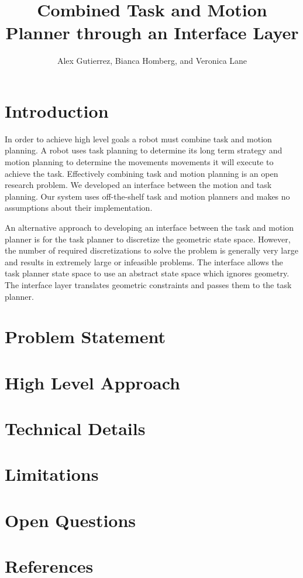 \documentclass[12pt]{article}
\title{Combined Task and Motion Planner through an Interface Layer}
\author{Alex Gutierrez, Bianca Homberg, and Veronica Lane}
\begin{document}
\maketitle

\section{Introduction}

In order to achieve high level goals a robot must combine task and motion planning. A robot uses task planning to determine its long term strategy and motion planning to determine the movements movements it  will execute to achieve the task. Effectively combining task and motion planning is an open research problem. We developed an interface between the motion and task planning. Our system uses off-the-shelf task and motion planners and makes no assumptions about their implementation.
 
An alternative approach to developing an interface between the task and motion planner is for the task planner to discretize the geometric state space. However, the number of required discretizations to solve the problem is generally very large and results in extremely large or infeasible problems. The interface allows the task planner state space to use an abstract state space which ignores geometry. The interface layer translates geometric constraints and passes them to the task planner.
\section{Problem Statement}



\section{High Level Approach}

\section{Technical Details}

\section{Limitations}

\section{Open Questions}

\section{References}
\end{document}
